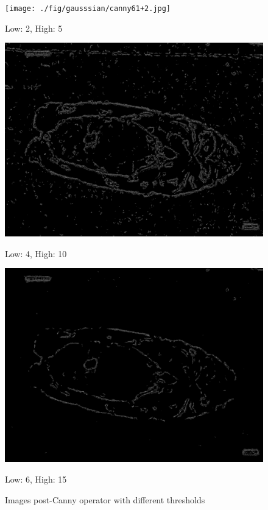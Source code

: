 \begin{figure}[H]
    \centering
    \begin{minipage}{0.32\textwidth}
        \centering
        \texttt{[image: ./fig/gausssian/canny61+2.jpg]}
        \caption*{Low: 2, High: 5}
    \end{minipage}
    \begin{minipage}{0.32\textwidth}
        \centering
        \includegraphics[width=\textwidth]{./fig/gausssian/canny61+4.jpg}
        \caption*{Low: 4, High: 10}
    \end{minipage}
    \begin{minipage}{0.32\textwidth}
        \centering
        \includegraphics[width=\textwidth]{./fig/gausssian/canny61+6.jpg}
        \caption*{Low: 6, High: 15}
    \end{minipage}
    \caption{Images post-Canny operator with different thresholds}
    \label{fig:canny}
\end{figure}

